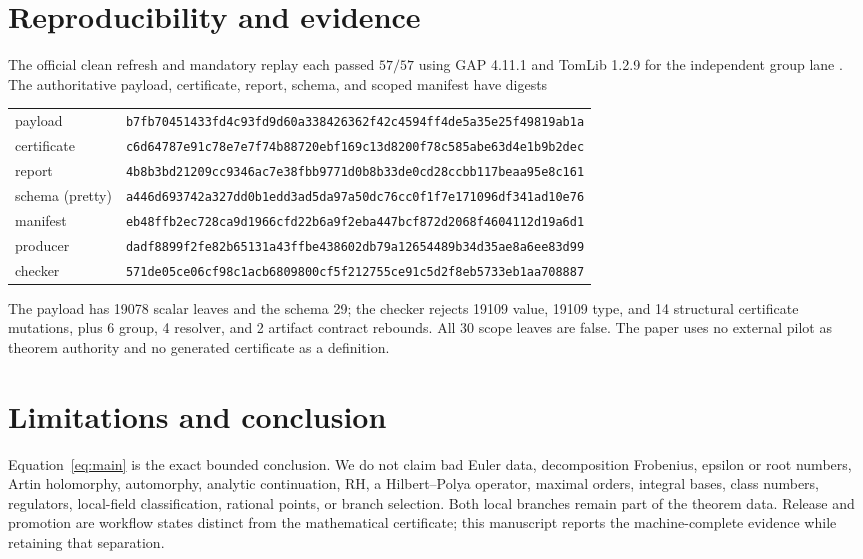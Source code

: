 \documentclass[11pt]{article}
\newcommand{\sha}[1]{\texttt{\scriptsize #1}}
\begin{document}
\section{Reproducibility and evidence}\label{sec:evidence}
The official clean refresh and mandatory replay each passed $57/57$ using GAP 4.11.1 and TomLib
1.2.9 for the independent group lane \cite{gap,tomlib}.  The authoritative payload,
certificate, report, schema, and scoped manifest have digests
\begin{center}\scriptsize
\begin{tabular}{@{}ll@{}}payload&\sha{b7fb70451433fd4c93fd9d60a338426362f42c4594ff4de5a35e25f49819ab1a}\\certificate&\sha{c6d64787e91c78e7e7f74b88720ebf169c13d8200f78c585abe63d4e1b9b2dec}\\report&\sha{4b8b3bd21209cc9346ac7e38fbb9771d0b8b33de0cd28ccbb117beaa95e8c161}\\schema (pretty)&\sha{a446d693742a327dd0b1edd3ad5da97a50dc76cc0f1f7e171096df341ad10e76}\\manifest&\sha{eb48ffb2ec728ca9d1966cfd22b6a9f2eba447bcf872d2068f4604112d19a6d1}\\producer&\sha{dadf8899f2fe82b65131a43ffbe438602db79a12654489b34d35ae8a6ee83d99}\\checker&\sha{571de05ce06cf98c1acb6809800cf5f212755ce91c5d2f8eb5733eb1aa708887}\end{tabular}\end{center}
The payload has 19078 scalar leaves and the schema 29; the checker rejects 19109 value,
19109 type, and 14 structural certificate mutations, plus 6 group, 4 resolver, and 2 artifact
contract rebounds.  All 30 scope leaves are false.  The paper uses no external pilot as theorem
authority and no generated certificate as a definition.

\section{Limitations and conclusion}
Equation~\eqref{eq:main} is the exact bounded conclusion.  We do not claim bad Euler data,
decomposition Frobenius, epsilon or root numbers, Artin holomorphy, automorphy, analytic
continuation, RH, a Hilbert--Polya operator, maximal orders, integral bases, class numbers,
regulators, local-field classification, rational points, or branch selection.  Both local branches
remain part of the theorem data.  Release and promotion are workflow states distinct from the
mathematical certificate; this manuscript reports the machine-complete evidence while retaining
that separation.
\end{document}
